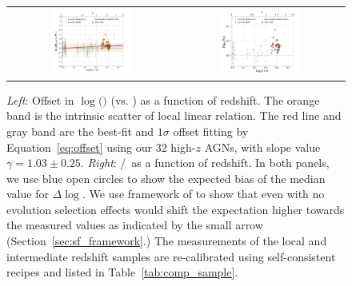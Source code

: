 \documentclass[apj]{emulateapj}
\begin{document}
\begin{figure}
\centering
\begin{tabular}{c c}
{\includegraphics[width=0.5\textwidth]{fig/MBH-Mstar-vz_style1.pdf}}&
{\includegraphics[width=0.5\textwidth]{fig/MBH-Mstar-vz_style0.pdf}}\\
\end{tabular}
\caption{\label{fig:MM-vz} 
 {\it Left}: Offset in  $\log($\mbh$)$ (vs. \smass) as a function of redshift. The orange band is the intrinsic scatter of local linear relation. The red line and gray band are the best-fit and $1\sigma$ offset fitting by Equation~\ref{eq:offset} using our 32 high-$z$ AGNs, with slope value $\gamma  = 1.03 \pm 0.25$. {\it Right}: \mbh/\smass\ as a function of redshift. In both panels, we use blue open circles to show the expected bias of the median value for $\Delta \log$\mbh. We use framework of \citet{Schulze2011,Schulze2014} to show that even with no evolution selection effects would shift the expectation higher towards the measured values as indicated by the small arrow (Section~\ref{sec:sf_framework}.) The measurements of the local and intermediate redshift samples are re-calibrated using self-consistent recipes and listed in Table~\ref{tab:comp_sample}.}
\end{figure} 
\end{document}
